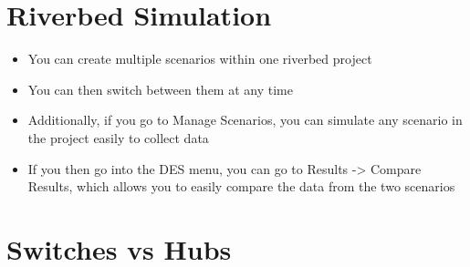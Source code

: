 
\section*{Riverbed Simulation}

\begin{itemize}
  \item You can create multiple scenarios within one riverbed project
  \item You can then switch between them at any time
  \item Additionally, if you go to Manage Scenarios, you can simulate any scenario in the project easily to collect data
  \item If you then go into the DES menu, you can go to Results -> Compare Results, which allows you to easily compare the data from the two scenarios
\end{itemize}

\section*{Switches vs Hubs}

